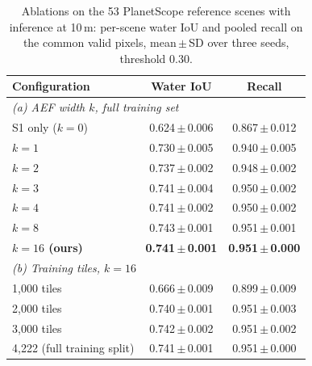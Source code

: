 \begin{table}[!t]
\centering
\caption{Ablations on the 53 PlanetScope reference scenes with inference at 10\,m: per-scene water IoU and pooled recall on the common valid pixels, mean\,$\pm$\,SD over three seeds, threshold 0.30.}
\label{tab:ablations030}
\footnotesize
\begin{tabular}{lcc}
\toprule
Configuration & Water IoU & Recall \\
\midrule
\multicolumn{3}{l}{\textit{(a) AEF width $k$, full training set}} \\
S1 only ($k=0$) & 0.624\,$\pm$\,0.006 & 0.867\,$\pm$\,0.012 \\
$k=1$ & 0.730\,$\pm$\,0.005 & 0.940\,$\pm$\,0.005 \\
$k=2$ & 0.737\,$\pm$\,0.002 & 0.948\,$\pm$\,0.002 \\
$k=3$ & 0.741\,$\pm$\,0.004 & 0.950\,$\pm$\,0.002 \\
$k=4$ & 0.741\,$\pm$\,0.002 & 0.950\,$\pm$\,0.002 \\
$k=8$ & 0.743\,$\pm$\,0.001 & 0.951\,$\pm$\,0.001 \\
\textbf{$k=16$ (ours)} & \textbf{0.741\,$\pm$\,0.001} & \textbf{0.951\,$\pm$\,0.000} \\
\midrule
\multicolumn{3}{l}{\textit{(b) Training tiles, $k=16$}} \\
1{,}000 tiles & 0.666\,$\pm$\,0.009 & 0.899\,$\pm$\,0.009 \\
2{,}000 tiles & 0.740\,$\pm$\,0.001 & 0.951\,$\pm$\,0.003 \\
3{,}000 tiles & 0.742\,$\pm$\,0.002 & 0.951\,$\pm$\,0.002 \\
4{,}222 (full training split) & 0.741\,$\pm$\,0.001 & 0.951\,$\pm$\,0.000 \\
\bottomrule
\end{tabular}
\end{table}
